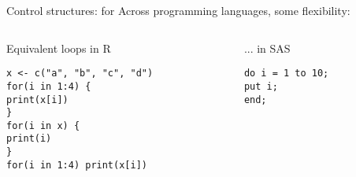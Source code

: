 \documentclass[xcolor=table,compress]{beamer}
\begin{document}
\begin{frame}[fragile]{Control structures: for}
Across programming languages, some flexibility:
\begin{columns}
\begin{column}[t]{.48\textwidth}
\pause
\begin{block}{Equivalent loops in R}
\lstset{language=R}
\begin{lstlisting}
x <- c("a", "b", "c", "d")
for(i in 1:4) {
print(x[i])
}
for(i in x) {
print(i)
}
for(i in 1:4) print(x[i])
\end{lstlisting}
\end{block}
\end{column}
\hfill
\begin{column}[t]{.48\textwidth}
\begin{block}{... in SAS}
\lstset{language=SAS}
\begin{lstlisting}
do i = 1 to 10;
put i;
end;
\end{lstlisting}
\end{block}
\end{column}

\end{columns}
\end{frame}
\end{document}
